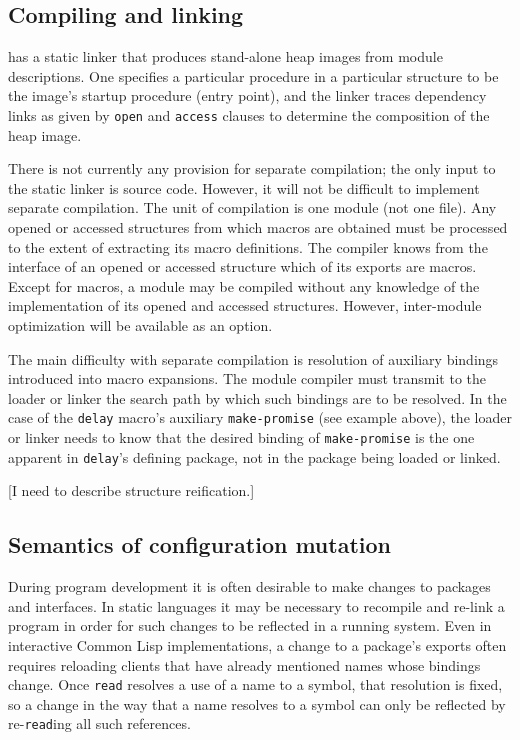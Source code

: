 \subsection*{Compiling and linking}

\hack{} has a static linker that produces stand-alone heap images
from module descriptions.  One specifies a particular procedure in a
particular structure to be the image's startup procedure (entry
point), and the linker traces dependency links as given by {\tt open}
and {\tt access} clauses to determine the composition of the heap
image.

There is not currently any provision for separate compilation; the
only input to the static linker is source code.  However, it will not
be difficult to implement separate compilation.  The unit of
compilation is one module (not one file).  Any opened or accessed
structures from which macros are obtained must be processed to the
extent of extracting its macro definitions.  The compiler knows from
the interface of an opened or accessed structure which of its exports
are macros.  Except for macros, a module may be compiled without any
knowledge of the implementation of its opened and accessed structures.
However, inter-module optimization will be available as an option.

The main difficulty with separate compilation is resolution of
auxiliary bindings introduced into macro expansions.  The module
compiler must transmit to the loader or linker the search path by
which such bindings are to be resolved.  In the case of the {\tt delay}
macro's auxiliary {\tt make-promise} (see example above), the loader
or linker needs to know that the desired binding of {\tt make-promise}
is the one apparent in {\tt delay}'s defining package, not in the
package being loaded or linked.

[I need to describe structure reification.]


\subsection*{Semantics of configuration mutation}

During program development it is often desirable to make changes to
packages and interfaces.  In static languages it may be necessary to
recompile and re-link a program in order for such changes to be
reflected in a running system.  Even in interactive Common Lisp
implementations, a change to a package's exports often requires
reloading clients that have already mentioned names whose bindings
change.  Once {\tt read} resolves a use of a name to a symbol, that
resolution is fixed, so a change in the way that a name resolves to a
symbol can only be reflected by re-{\tt read}ing all such references.

